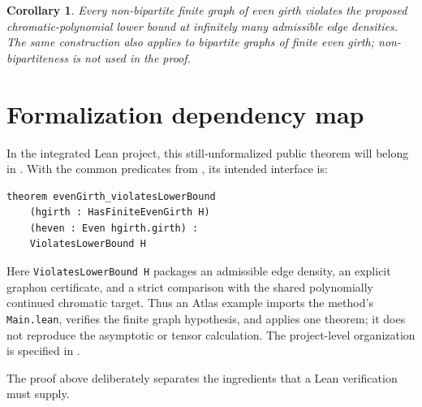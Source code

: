 \documentclass[11pt]{article}
\newtheorem{corollary}{Corollary}
\begin{document}
\begin{corollary}
Every non-bipartite finite graph of even girth violates the proposed
chromatic-polynomial lower bound at infinitely many admissible edge
densities.  The same construction also applies to bipartite graphs of
finite even girth; non-bipartiteness is not used in the proof.
\end{corollary}

\section{Formalization dependency map}

In the integrated Lean project, this still-unformalized public theorem will
belong in .  With the
common predicates from , its
intended interface is:

\begin{verbatim}
theorem evenGirth_violatesLowerBound
    (hgirth : HasFiniteEvenGirth H)
    (heven : Even hgirth.girth) :
    ViolatesLowerBound H
\end{verbatim}

Here \texttt{ViolatesLowerBound H} packages an admissible edge density, an
explicit graphon certificate, and a strict comparison with the shared
polynomially continued chromatic target.  Thus an Atlas example imports the
method's \texttt{Main.lean}, verifies the finite graph hypothesis, and applies
one theorem; it does not reproduce the asymptotic or tensor calculation.
The project-level organization is specified in
.

The proof above deliberately separates the ingredients that a Lean
verification must supply.
\end{document}
